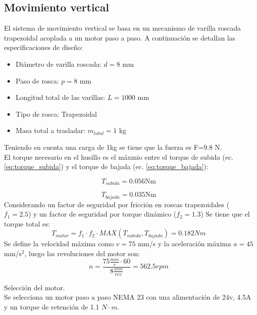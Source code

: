 \subsection{Movimiento vertical}
\label{sec:mov_vertical_prototipo}

El sistema de movimiento vertical se basa en un mecanismo de varilla roscada trapezoidal acoplada a un motor paso a paso. A continuación se detallan las especificaciones de diseño:

\begin{itemize}[label=$\bullet$]
    \item Diámetro de varilla roscada: $d = 8$ mm
    \item Paso de rosca: $p = 8$ mm
    \item Longitud total de las varillas: $L = 1000$ mm
    \item Tipo de rosca: Trapezoidal
    \item Masa total a trasladar: $m_{total} = 1$ kg
\end{itemize}

Teniendo en cuenta una carga de 1kg se tiene que la fuerza es F=9.8 N. \\

El torque necesario en el husillo es el máxmio entre el torque de subida (ec. \ref{eq:torque_subida}) y el torque de bajada (ec. \ref{eq:torque_bajada}):

\begin{equation}
T_{subida}= 0.056\text{Nm}
\end{equation}

\begin{equation}
T_{bajada}= 0.035 \text{Nm}
\end{equation}
Considerando un factor de seguridad por fricción en roscas trapezoidales (\(f_1=2.5\)) y un factor de seguridad por torque dinámico (\(f_2=1.3\))
Se tiene que el torque total es: 
\[T_{motor}=f_1 \cdot f_2 \cdot MAX(T_{subida}, T_{bajada})= 0.182Nm\]
Se define la velocidad máxima como $v = 75$ mm/s y la aceleración máxima $a = 45$ mm/s$^2$, luego las revoluciones del motor son:
\[n= \frac{ 75 \frac{mm}{s} \cdot 60}{8 \frac{mm}{rev}}=562.5 rpm\]

Selección del motor.\\
\noindent
Se selecciona un motor paso a paso NEMA 23 con una alimentación de 24v, 4.5A y un torque de retención de 1.1 \(N \cdot m\).

